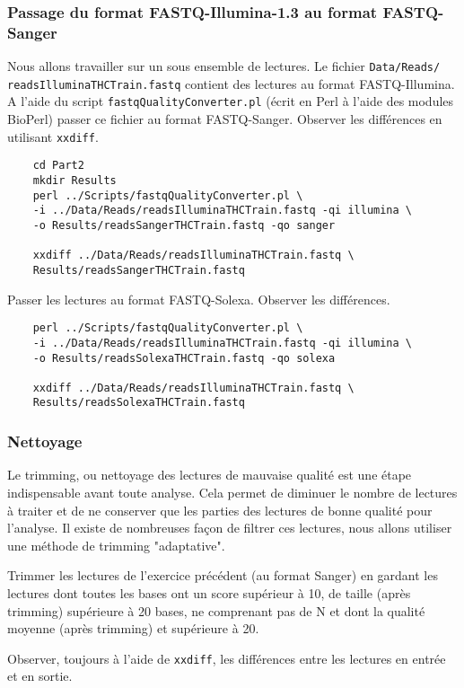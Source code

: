 \documentclass[a4paper,12pt]{article}
\begin{document}
\subsubsection{Passage du format FASTQ-Illumina-1.3 au format FASTQ-Sanger}
Nous allons travailler sur un sous ensemble de lectures. Le fichier \verb=Data/Reads/= \\
\verb=readsIlluminaTHCTrain.fastq= contient des lectures au format FASTQ-Illumina. A l'aide du script \verb=fastqQualityConverter.pl= (écrit en Perl à l'aide des modules BioPerl) passer ce fichier au format FASTQ-Sanger. Observer les différences
en utilisant \verb=xxdiff=.
\begin{lstlisting}
	cd Part2
	mkdir Results
	perl ../Scripts/fastqQualityConverter.pl \
	-i ../Data/Reads/readsIlluminaTHCTrain.fastq -qi illumina \
	-o Results/readsSangerTHCTrain.fastq -qo sanger
	
	xxdiff ../Data/Reads/readsIlluminaTHCTrain.fastq \
	Results/readsSangerTHCTrain.fastq
\end{lstlisting}


Passer les lectures au format FASTQ-Solexa. Observer les différences.

\begin{lstlisting}
	perl ../Scripts/fastqQualityConverter.pl \
	-i ../Data/Reads/readsIlluminaTHCTrain.fastq -qi illumina \
	-o Results/readsSolexaTHCTrain.fastq -qo solexa
	
	xxdiff ../Data/Reads/readsIlluminaTHCTrain.fastq \
	Results/readsSolexaTHCTrain.fastq
\end{lstlisting}
	
	
\subsubsection{Nettoyage}
Le trimming, ou nettoyage des lectures de mauvaise qualité est une étape indispensable avant toute analyse. Cela permet de diminuer le nombre de lectures à traiter et de ne conserver que les parties des lectures de bonne qualité pour l'analyse. Il existe de nombreuses façon de filtrer ces lectures, nous allons utiliser une méthode de  trimming "adaptative".

Trimmer les lectures de l'exercice précédent (au format Sanger) en gardant les lectures dont toutes les bases ont  un score supérieur à 10, de taille (après trimming) supérieure à 20 bases, ne comprenant pas de N et dont la qualité moyenne (après trimming) et supérieure à 20. 

Observer, toujours à l'aide de \verb=xxdiff=, les différences entre les lectures en entrée et en sortie.
\end{document}
